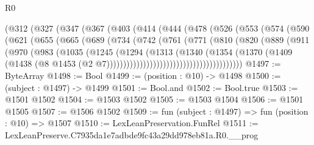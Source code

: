 \begin{lexlean}{R0}
\begin{coremodule}
            (@312
              (@327
                (@347
                  (@367
                    (@403
                      (@414
                        (@444
                          (@478
                            (@526
                              (@553
                                (@574
                                  (@590
                                    (@621
                                      (@655
                                        (@665
                                          (@689
                                            (@734
                                              (@742
                                                (@761
                                                  (@771
                                                    (@810
                                                      (@820
                                                        (@889
                                                          (@911
                                                            (@970
                                                              (@983
                                                                (@1035
                                                                  (@1245
                                                                    (@1294
                                                                      (@1313
                                                                        (@1340
                                                                          (@1354
                                                                            (@1370
                                                                              (@1409
                                                                                (@1438
                                                                                  (@8
                                                                                    @1453
                                                                                    (@2
                                                                                      @7)))))))))))))))))))))))))))))))))))))))))
@1497 := ByteArray
@1498 := Bool
@1499 := (position : @10) -> @1498
@1500 := (subject : @1497) -> @1499
@1501 := Bool.and
@1502 := Bool.true
@1503 := @1501 @1502
@1504 := @1503 @1502
@1505 := @1503 @1504
@1506 := @1501 @1505
@1507 := @1506 @1502
@1509 := fun (subject : @1497) => fun (position : @10) => @1507
@1510 := LexLeanPreservation.FunRel
@1511 := LexLeanPreserve.C7935da1e7adbde9fc43a29dd978eb81a.R0.__prog

\end{coremodule}
\end{lexlean}
